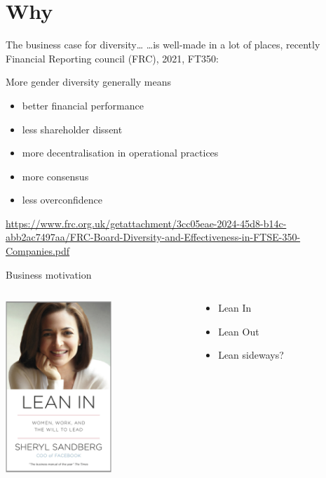 \documentclass[xcolor=table,aspectratio=169]{beamer}
\begin{document}
\section{Why}

\begin{frame}{The business case for diversity\ldots}
	\ldots is well-made in a lot of places, recently Financial Reporting council (FRC), 2021, FT350:

More gender diversity generally means 
	\begin{itemize}
		\item better financial performance
		\item less shareholder dissent
		\item more decentralisation in operational practices
		\item more consensus
		\item less overconfidence
	\end{itemize}


	\tiny{\url{https://www.frc.org.uk/getattachment/3cc05eae-2024-45d8-b14c-abb2ac7497aa/FRC-Board-Diversity-and-Effectiveness-in-FTSE-350-Companies.pdf}}
\end{frame}

\begin{frame}{Business motivation}
	\begin{columns}
		\begin{column}{0.5\textwidth}
	\includegraphics[width=4cm]{lean.jpg}
		\end{column}
		\begin{column}{0.5\textwidth}
			\begin{itemize}
					\pause
				\item Lean In
					\pause
				\item Lean Out
					\pause
				\item Lean sideways?
			\end{itemize}

		\end{column}
	\end{columns}
\end{frame}
\end{document}

